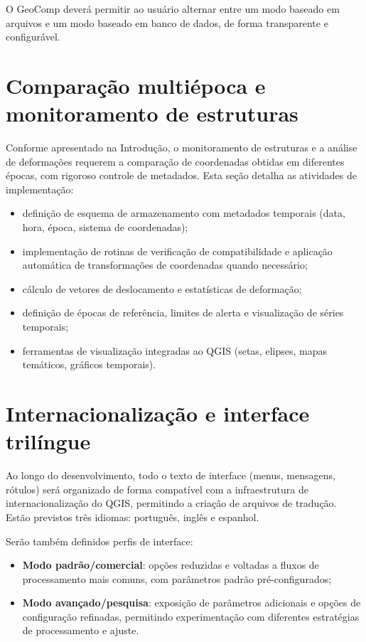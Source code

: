 \documentclass[
        12pt,                           %
        openright,                      %
        oneside,
        a4paper,                        %
        chapter=TITLE,         %
        section=TITLE,         %
        subsection=Title,      %
        english,                        %
        portugues,                      %
        ]{abntex2}
\begin{document}
O GeoComp deverá permitir ao usuário alternar entre um modo baseado em arquivos e um modo baseado em banco de dados, de forma transparente e configurável.


\section{Comparação multiépoca e monitoramento de estruturas}

Conforme apresentado na Introdução, o monitoramento de estruturas e a análise de deformações requerem a comparação de coordenadas obtidas em diferentes épocas, com rigoroso controle de metadados. Esta seção detalha as atividades de implementação:

\begin{itemize}
    \item definição de esquema de armazenamento com metadados temporais (data, hora, época, sistema de coordenadas);
    \item implementação de rotinas de verificação de compatibilidade e aplicação automática de transformações de coordenadas quando necessário;
    \item cálculo de vetores de deslocamento e estatísticas de deformação;
    \item definição de épocas de referência, limites de alerta e visualização de séries temporais;
    \item ferramentas de visualização integradas ao QGIS (setas, elipses, mapas temáticos, gráficos temporais).
\end{itemize}


\section{Internacionalização e interface trilíngue}

Ao longo do desenvolvimento, todo o texto de interface (menus, mensagens, rótulos) será organizado de forma compatível com a infraestrutura de internacionalização do QGIS, permitindo a criação de arquivos de tradução. Estão previstos três idiomas: português, inglês e espanhol.

Serão também definidos perfis de interface:

\begin{itemize}
    \item \textbf{Modo padrão/comercial}: opções reduzidas e voltadas a fluxos de processamento mais comuns, com parâmetros padrão pré-configurados;
    \item \textbf{Modo avançado/pesquisa}: exposição de parâmetros adicionais e opções de configuração refinadas, permitindo experimentação com diferentes estratégias de processamento e ajuste.
\end{itemize}
\end{document}
